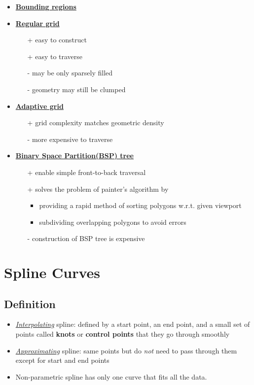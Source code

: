 \documentclass[twocolumn,landscape,10pt]{article}
\theoremstyle{definition}
\begin{document}
\begin{itemize}
    \item \underline{\textbf{Bounding regions}}
    \item \underline{\textbf{Regular grid}}
        \begin{itemize}
            \item[+] easy to construct
            \item[+] easy to traverse
            \item[-] may be only sparsely filled
            \item[-] geometry may still be clumped
        \end{itemize} 
    \item \underline{\textbf{Adaptive grid}}
        \begin{itemize}
            \item[+] grid complexity matches geometric density
            \item[-] more expensive to traverse
        \end{itemize} 
    \item \underline{\textbf{Binary Space Partition(BSP) tree}}
        \begin{itemize}
            \item[+] enable simple front-to-back traversal
            \item[+] solves the problem of painter's algorithm by
                \begin{itemize}
                    \item providing a rapid method of sorting polygons w.r.t.
                        given viewport
                    \item subdividing overlapping polygons to avoid errors
                \end{itemize} 
            \item[-] construction of BSP tree is expensive
        \end{itemize} 
\end{itemize} 


\section{Spline Curves}

\subsection{Definition}

\begin{itemize}
    \item \underline{\emph{Interpolating}} spline: defined by a start point, an end point,
        and a small set of points called \textbf{knots} or \textbf{control
        points} that they go through smoothly
    \item \underline{\emph{Approximating}} spline: same points but do \emph{not} need to
        pass through them except for start and end points
    \item Non-parametric spline has only one curve that fits all the data.
\end{itemize} 
\end{document}
